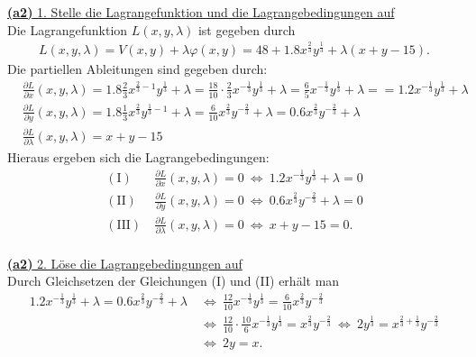 \underline{\textbf{(a2)} 1. Stelle die Lagrangefunktion und die Lagrangebedingungen auf}\\
Die Lagrangefunktion $L(x,y, \lambda)$ ist gegeben durch
\begin{align*}
	L(x,y, \lambda) 
	=
	V(x,y) + \lambda \varphi(x,y)
	= 
	48 + 1.8 x^{\frac{2}{3}} y^{\frac{1}{3}} + \lambda(x+y-15).
\end{align*}
Die partiellen Ableitungen sind gegeben durch:
\begin{align*}
	&\frac{\partial L }{\partial x}(x,y,\lambda) = 
	1.8 \frac{2}{3} x^{\frac{2}{3} - 1 } y^{\frac{1}{3}} + \lambda
	= 
	\frac{18}{10} \cdot \frac{2}{3} x^{-\frac{1}{3}} y^{\frac{1}{3}} + \lambda
	= 
	\frac{6}{5}  x^{-\frac{1}{3}} y^{\frac{1}{3}} + \lambda
	=
	= 
	1.2  x^{-\frac{1}{3}} y^{\frac{1}{3}} + \lambda
	\\
	&\frac{\partial L }{\partial y}(x,y,\lambda) 
	=
	1.8 \frac{1}{3} x^{\frac{2}{3}  } y^{\frac{1}{3}- 1} + \lambda
	=
	\frac{6}{10} x^{\frac{2}{3}  } y^{-\frac{2}{3}} + \lambda
	=
	0.6 x^{\frac{2}{3}  } y^{-\frac{2}{3}} + \lambda
	\\
	&\frac{\partial L }{\partial \lambda}(x,y,\lambda) = x + y -15
\end{align*}
Hieraus ergeben sich die Lagrangebedingungen:
\begin{align*}
	\mathrm{(I)}& \
	\frac{\partial L }{\partial x}(x,y,\lambda) = 0
	\ \Leftrightarrow \
	1.2  x^{-\frac{1}{3}} y^{\frac{1}{3}} + \lambda = 0
	\\
	\mathrm{(II)}& \
	\frac{\partial L }{\partial y}(x,y,\lambda) = 0
	\ \Leftrightarrow \
	0.6 x^{\frac{2}{3}  } y^{-\frac{2}{3}} + \lambda = 0
	\\
	\mathrm{(III)}& \
	\frac{\partial L }{\partial \lambda}(x,y,\lambda) = 0
	\ \Leftrightarrow \
	 x + y -15 = 0.
\end{align*}
\ \\
\underline{\textbf{(a2)} 2. Löse die Lagrangebedingungen auf}\\
Durch Gleichsetzen der Gleichungen (I) und (II) erhält man 
\begin{align*}
	1.2  x^{-\frac{1}{3}} y^{\frac{1}{3}} + \lambda
	=
	0.6 x^{\frac{2}{3}  } y^{-\frac{2}{3}} + \lambda
	\ &\Leftrightarrow \
	\frac{12}{10} x^{-\frac{1}{3}} y^{\frac{1}{3}}
	=
	\frac{6}{10} x^{\frac{2}{3}  } y^{-\frac{2}{3}} \\
	\ &\Leftrightarrow \
	\frac{12}{10} \cdot \frac{10}{6} x^{-\frac{1}{3}} y^{\frac{1}{3}}
	= 
	x^{\frac{2}{3}  } y^{-\frac{2}{3}} 
	\ \Leftrightarrow \
	2  y^{\frac{1}{3}}
	= 
	x^{\frac{2}{3} + \frac{1}{3} } y^{-\frac{2}{3}} \\
	\ &\Leftrightarrow \
	2  y
	= 
	x.
\end{align*}
